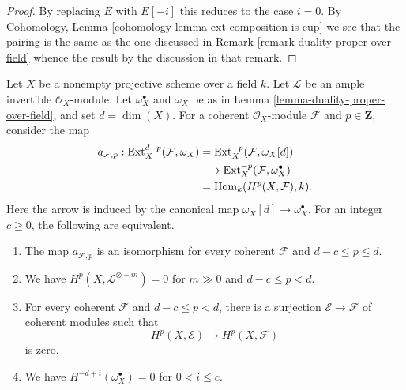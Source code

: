 \begin{proof}
By replacing $E$ with $E[-i]$ this reduces to the case $i = 0$.
By Cohomology, Lemma \ref{cohomology-lemma-ext-composition-is-cup}
we see that the pairing is the same as the one discussed
in Remark \ref{remark-duality-proper-over-field}
whence the result by the discussion in that remark.
\end{proof}

\begin{lemma}
\label{lemma-duality-proper-over-field-in-range}
Let $X$ be a nonempty projective scheme over a field $k$.
Let $\mathcal{L}$ be an ample invertible $\mathcal{O}_X$-module.
Let $\omega_X^\bullet$ and $\omega_X$ be as in
Lemma \ref{lemma-duality-proper-over-field}, and set $d = \dim(X)$.
For a coherent $\mathcal{O}_X$-module $\mathcal{F}$ and $p \in \mathbf{Z}$,
consider the map
$$
\begin{aligned}
a_{\mathcal{F}, p} :
\mathop{\mathrm{Ext}}\nolimits_X^{d - p}(\mathcal{F}, \omega_X)
& = \mathop{\mathrm{Ext}}\nolimits_X^{-p}(\mathcal{F}, \omega_X[d]) \\
& \longrightarrow \mathop{\mathrm{Ext}}\nolimits_X^{-p}(\mathcal{F}, \omega_X^\bullet) \\
& = \mathop{\mathrm{Hom}}\nolimits_k(H^p(X, \mathcal{F}), k).
\end{aligned}
$$
Here the arrow is induced by the canonical map
$\omega_X[d] \to \omega_X^\bullet$. For an integer $c \geq 0$, the
following are equivalent.
\begin{enumerate}
\item The map $a_{\mathcal{F}, p}$ is an isomorphism for every coherent
$\mathcal{F}$ and $d - c \leq p \leq d$.
\item We have
$H^p(X, \mathcal{L}^{\otimes -m}) = 0$ for $m \gg 0$ and
$d - c \leq p < d$.
\item For every coherent $\mathcal{F}$ and $d - c \leq p < d$, there
is a surjection $\mathcal{E} \to \mathcal{F}$ of coherent modules such that
$$
H^p(X, \mathcal{E}) \longrightarrow H^p(X, \mathcal{F})
$$
is zero.
\item We have $H^{-d + i}(\omega_X^\bullet) = 0$ for $0 < i \leq c$.
\end{enumerate}
\end{lemma}

